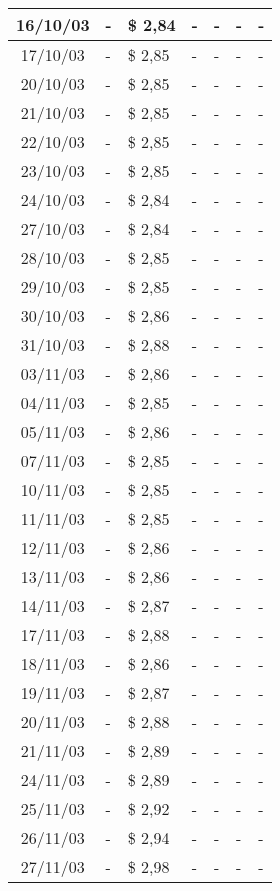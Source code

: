 \begin{center}
\begin{longtable}{|c|p{1.5cm}|p{1.5cm}|p{1.5cm}|p{1.5cm}|p{1.5cm}|p{1.5cm}|}
16/10/03 & - & \$ 2,84 & - & - & - & - \\ \hline
17/10/03 & - & \$ 2,85 & - & - & - & - \\ \hline
20/10/03 & - & \$ 2,85 & - & - & - & - \\ \hline
21/10/03 & - & \$ 2,85 & - & - & - & - \\ \hline
22/10/03 & - & \$ 2,85 & - & - & - & - \\ \hline
23/10/03 & - & \$ 2,85 & - & - & - & - \\ \hline
24/10/03 & - & \$ 2,84 & - & - & - & - \\ \hline
27/10/03 & - & \$ 2,84 & - & - & - & - \\ \hline
28/10/03 & - & \$ 2,85 & - & - & - & - \\ \hline
29/10/03 & - & \$ 2,85 & - & - & - & - \\ \hline
30/10/03 & - & \$ 2,86 & - & - & - & - \\ \hline
31/10/03 & - & \$ 2,88 & - & - & - & - \\ \hline
03/11/03 & - & \$ 2,86 & - & - & - & - \\ \hline
04/11/03 & - & \$ 2,85 & - & - & - & - \\ \hline
05/11/03 & - & \$ 2,86 & - & - & - & - \\ \hline
07/11/03 & - & \$ 2,85 & - & - & - & - \\ \hline
10/11/03 & - & \$ 2,85 & - & - & - & - \\ \hline
11/11/03 & - & \$ 2,85 & - & - & - & - \\ \hline
12/11/03 & - & \$ 2,86 & - & - & - & - \\ \hline
13/11/03 & - & \$ 2,86 & - & - & - & - \\ \hline
14/11/03 & - & \$ 2,87 & - & - & - & - \\ \hline
17/11/03 & - & \$ 2,88 & - & - & - & - \\ \hline
18/11/03 & - & \$ 2,86 & - & - & - & - \\ \hline
19/11/03 & - & \$ 2,87 & - & - & - & - \\ \hline
20/11/03 & - & \$ 2,88 & - & - & - & - \\ \hline
21/11/03 & - & \$ 2,89 & - & - & - & - \\ \hline
24/11/03 & - & \$ 2,89 & - & - & - & - \\ \hline
25/11/03 & - & \$ 2,92 & - & - & - & - \\ \hline
26/11/03 & - & \$ 2,94 & - & - & - & - \\ \hline
27/11/03 & - & \$ 2,98 & - & - & - & - \\ \hline

\end{longtable}
\end{center}
